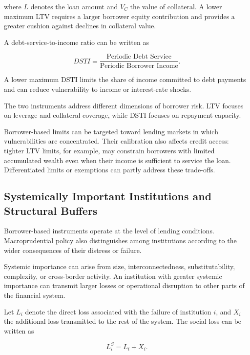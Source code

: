 where \(L\) denotes the loan amount and \(V_C\) the value of collateral. A lower maximum LTV requires a larger borrower equity contribution and provides a greater cushion against declines in collateral value.

A debt-service-to-income ratio can be written as

\begin{equation}
DSTI
=\frac{\text{Periodic Debt Service}}
{\text{Periodic Borrower Income}}.
\label{eq:ch23-dsti}
\end{equation}

A lower maximum DSTI limits the share of income committed to debt payments and can reduce vulnerability to income or interest-rate shocks.

The two instruments address different dimensions of borrower risk. LTV focuses on leverage and collateral coverage, while DSTI focuses on repayment capacity.

Borrower-based limits can be targeted toward lending markets in which vulnerabilities are concentrated. Their calibration also affects credit access: tighter LTV limits, for example, may constrain borrowers with limited accumulated wealth even when their income is sufficient to service the loan. Differentiated limits or exemptions can partly address these trade-offs.

\subsection{Systemically Important Institutions and Structural Buffers}

Borrower-based instruments operate at the level of lending conditions. Macroprudential policy also distinguishes among institutions according to the wider consequences of their distress or failure.

Systemic importance can arise from size, interconnectedness, substitutability, complexity, or cross-border activity. An institution with greater systemic importance can transmit larger losses or operational disruption to other parts of the financial system.

Let \(L_i\) denote the direct loss associated with the failure of institution \(i\), and \(X_i\) the additional loss transmitted to the rest of the system. The social loss can be written as

\begin{equation}
L_i^{S}
=L_i+X_i.
\label{eq:ch23-systemic-loss}
\end{equation}


